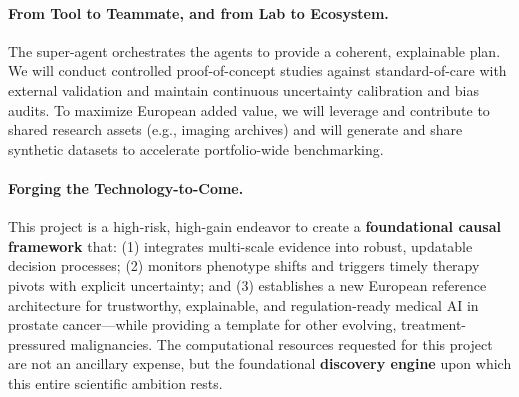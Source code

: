 \documentclass[11pt, a4paper]{article}
\begin{document}
\paragraph{From Tool to Teammate, and from Lab to Ecosystem.} The super-agent orchestrates the agents to provide a coherent, explainable plan. We will conduct controlled proof-of-concept studies against standard-of-care with external validation and maintain continuous uncertainty calibration and bias audits. To maximize European added value, we will leverage and contribute to shared research assets (e.g., imaging archives) and will generate and share synthetic datasets to accelerate portfolio-wide benchmarking.

\paragraph{Forging the Technology-to-Come.} This project is a high-risk, high-gain endeavor to create a \textbf{foundational causal framework} that: (1) integrates multi-scale evidence into robust, updatable decision processes; (2) monitors phenotype shifts and triggers timely therapy pivots with explicit uncertainty; and (3) establishes a new European reference architecture for trustworthy, explainable, and regulation-ready medical AI in prostate cancer—while providing a template for other evolving, treatment-pressured malignancies. The computational resources requested for this project are not an ancillary expense, but the foundational \textbf{discovery engine} upon which this entire scientific ambition rests.
\end{document}
